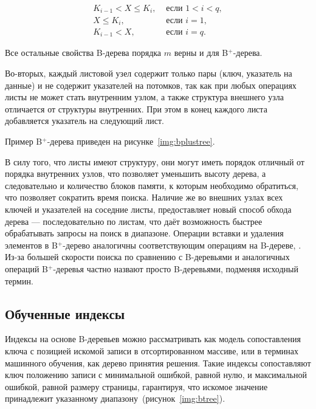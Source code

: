 \begin{equation}\label{eq:04}
    \begin{aligned}
        K_{i-1} < X \leqslant K_i, & \text{ если } 1 < i < q,\\
        X \leqslant K_i, & \text{ если } i = 1,\\
        K_{i-1} < X, & \text{ если } i = q.
    \end{aligned}
\end{equation}

Все остальные свойства B-дерева порядка $m$ верны и для B$^+$-дерева.

Во-вторых, каждый листовой узел содержит только пары (ключ, указатель на данные)
и не содержит указателей на потомков, так как при любых операциях листы не может
стать внутренним узлом, а также структура внешнего узла отличается от структуры
внутренних. При этом в конец каждого листа добавляется указатель на следующий
лист.

Пример B$^+$-дерева приведен на рисунке~\ref{img:bplustree}.


В силу того, что листы имеют структуру, они могут иметь порядок отличный от
порядка внутренних узлов, что позволяет уменьшить высоту дерева, а следовательно
и количество блоков памяти, к которым необходимо обратиться, что позволяет
сократить время поиска. Наличие же во внешних узлах всех ключей и указателей на
соседние листы, предоставляет новый способ обхода дерева --- последовательно по
листам, что даёт возможность быстрее обрабатывать запросы на поиск в диапазоне.
Операции вставки и удаления элементов в B$^+$-дерево аналогичны соответствующим
операциям на B-дереве, . Из-за большей скорости поиска по
сравнению с B-деревьями и аналогичных операций B$^+$-деревья частно назвают
просто B-деревьями, подменяя исходный термин.

\subsection{Обученные индексы}

Индексы на основе B-деревьев можно рассматривать как модель сопоставления ключа
с позицией искомой записи в отсортированном массиве, или в терминах машинного
обучения, как дерево принятия решения. Такие индексы сопоставляют ключ положению
записи с минимальной ошибкой, равной нулю, и максимальной ошибкой, равной
размеру страницы, гарантируя, что искомое значение принадлежит указанному
диапазону~(рисунок~\ref{img:btree}). 

